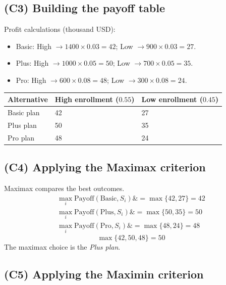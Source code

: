 \documentclass[11pt]{article}
\begin{document}
	\subsection*{(C3) Building the payoff table}
	
	\hypertarget{problem5-c3}{}
	
	Profit calculations (thousand USD):
	\begin{itemize}
		\item Basic: High $\to 1400 \times 0.03 = 42$; Low $\to 900 \times 0.03 = 27$.
		\item Plus: High $\to 1000 \times 0.05 = 50$; Low $\to 700 \times 0.05 = 35$.
		\item Pro: High $\to 600 \times 0.08 = 48$; Low $\to 300 \times 0.08 = 24$.
	\end{itemize}
	\begin{center}
		\begin{tabular}{lll}
			\toprule
			Alternative & High enrollment
			($0.55$) & Low enrollment
			($0.45$) \\
			\midrule
			Basic plan & 42 & 27 \\
			Plus plan & 50 & 35 \\
			Pro plan & 48 & 24 \\
			\bottomrule
		\end{tabular}
	\end{center}
	
	\subsection*{(C4) Applying the Maximax criterion}
	
	\hypertarget{problem5-c4}{}
	
	Maximax compares the best outcomes.
	\[
	\begin{aligned}
		\max_i \text{Payoff}(\text{Basic}, S_i) \&= \max\{42, 27\} = 42 \\
		\max_i \text{Payoff}(\text{Plus}, S_i) \&= \max\{50, 35\} = 50 \\
		\max_i \text{Payoff}(\text{Pro}, S_i) \&= \max\{48, 24\} = 48
	\end{aligned}
	\]
	\[
	\max\{42, 50, 48\} = 50
	\]
	The maximax choice is the \emph{Plus plan}.
	
	\subsection*{(C5) Applying the Maximin criterion}
	
	\hypertarget{problem5-c5}{}
	
\end{document}
